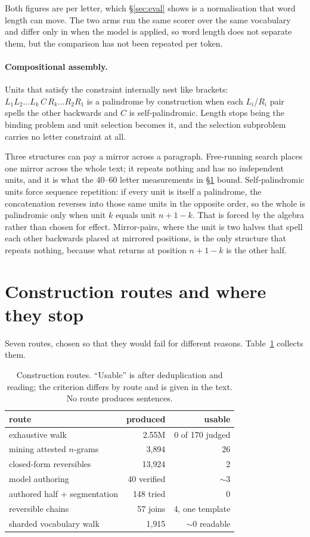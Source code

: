 \documentclass[11pt]{article}
\begin{document}
Both figures are per letter, which \S\ref{sec:eval} shows is a normalisation
that word length can move. The two arms run the same scorer over the same
vocabulary and differ only in when the model is applied, so word length does not
separate them, but the comparison has not been repeated per token.

\paragraph{Compositional assembly.}
Units that satisfy the constraint internally nest like brackets:
$L_1 L_2 \ldots L_k\, C\, R_k \ldots R_2 R_1$ is a palindrome by construction
when each $L_i$/$R_i$ pair spells the other backwards and $C$ is
self-palindromic. Length stops being the binding problem and unit selection
becomes it, and the selection subproblem carries no letter constraint at all.

Three structures can pay a mirror across a paragraph. Free-running search
places one mirror across the whole text; it repeats nothing and has no
independent units, and it is what the 40--60 letter measurements in
\S\ref{sec:ceiling} bound. Self-palindromic units force sequence repetition:
if every unit is itself a palindrome, the concatenation reverses into those
same units in the opposite order, so the whole is palindromic only when unit
$k$ equals unit $n{+}1{-}k$. That is forced by the algebra rather than chosen
for effect. Mirror-pairs, where the unit is two halves that spell each other
backwards placed at mirrored positions, is the only structure that repeats
nothing, because what returns at position $n{+}1{-}k$ is the other half.

\section{Construction routes and where they stop}
\label{sec:ceiling}

Seven routes, chosen so that they would fail for different reasons.
Table~\ref{tab:routes} collects them.

\begin{table}[t]
\centering\small
\begin{tabular}{@{}lrr@{}}
\toprule
route & produced & usable \\
\midrule
exhaustive walk & 2.55M & 0 of 170 judged \\
mining attested $n$-grams & 3{,}894 & 26 \\
closed-form reversibles & 13{,}924 & 2 \\
model authoring & 40 verified & $\sim$3 \\
authored half + segmentation & 148 tried & 0 \\
reversible chains & 57 joins & 4, one template \\
sharded vocabulary walk & 1{,}915 & $\sim$0 readable \\
\bottomrule
\end{tabular}
\caption{Construction routes. ``Usable'' is after deduplication and reading;
the criterion differs by route and is given in the text. No route produces
sentences.}
\label{tab:routes}
\end{table}
\end{document}
